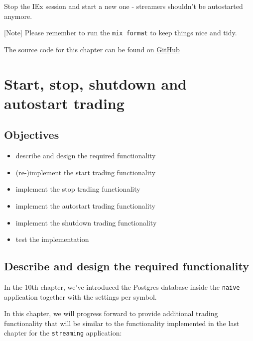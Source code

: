 \documentclass[
  oneside]{book}
\providecommand{\tightlist}{%
  \setlength{\itemsep}{0pt}\setlength{\parskip}{0pt}}
\begin{document}
Stop the IEx session and start a new one - streamers shouldn't be autostarted anymore.

{[}Note{]} Please remember to run the \texttt{mix\ format} to keep things nice and tidy.

The source code for this chapter can be found on \href{https://github.com/Cinderella-Man/hands-on-elixir-and-otp-cryptocurrency-trading-bot-source-code/tree/chapter_11}{GitHub}

\chapter{Start, stop, shutdown and autostart trading}\label{start-stop-shutdown-and-autostart-trading}

\section{Objectives}\label{objectives-11}

\begin{itemize}
\tightlist
\item
  describe and design the required functionality
\item
  (re-)implement the start trading functionality
\item
  implement the stop trading functionality
\item
  implement the autostart trading functionality
\item
  implement the shutdown trading functionality
\item
  test the implementation
\end{itemize}

\section{Describe and design the required functionality}\label{describe-and-design-the-required-functionality-3}

In the 10th chapter, we've introduced the Postgres database inside the \texttt{naive} application together with the settings per symbol.

In this chapter, we will progress forward to provide additional trading functionality that will be similar to the functionality implemented in the last chapter for the \texttt{streaming} application:
\end{document}
